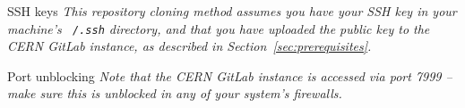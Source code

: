 \begin{warningbox}{SSH keys}
\emph{This repository cloning method assumes you have your \ac{SSH} key in your
machine's \texttt{~/.ssh} directory, and that you have uploaded the
public key to the CERN GitLab instance, as described in
Section~\ref{sec:prerequisites}.}
\end{warningbox}

\begin{warningbox}{Port unblocking}
\emph{Note that the CERN GitLab instance is accessed via port 7999 -- make
sure this is unblocked in any of your system's firewalls.}
\end{warningbox}


\clearpage



\clearpage



